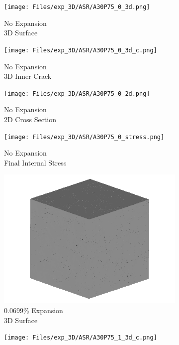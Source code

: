 \begin{figure}[ht!]
\centering
    \begin{subfigure}{.25\textwidth}
      \centering
      \texttt{[image: Files/exp\_3D/ASR/A30P75\_0\_3d.png]}
      \caption{No Expansion\\3D Surface}
    \end{subfigure}%
    \begin{subfigure}{.25\textwidth}
      \centering
      \texttt{[image: Files/exp\_3D/ASR/A30P75\_0\_3d\_c.png]}
      \caption{No Expansion\\3D Inner Crack}
    \end{subfigure}%
    \begin{subfigure}{.25\textwidth}
      \centering
      \texttt{[image: Files/exp\_3D/ASR/A30P75\_0\_2d.png]}
      \caption{No Expansion\\2D Cross Section}
    \end{subfigure}%
    \begin{subfigure}{.25\textwidth}
      \centering
      \texttt{[image: Files/exp\_3D/ASR/A30P75\_0\_stress.png]}
      \caption{No Expansion\\Final Internal Stress}
    \end{subfigure}
    \begin{subfigure}{.25\textwidth}
      \centering
      \includegraphics[width=.8\linewidth]{Files/exp_3D/ASR/A30P75_1_3d.png}
      \caption{0.0699\% Expansion\\3D Surface}
    \end{subfigure}%
    \begin{subfigure}{.25\textwidth}
      \centering
      \texttt{[image: Files/exp\_3D/ASR/A30P75\_1\_3d\_c.png]}

\end{subfigure}
\end{figure}
